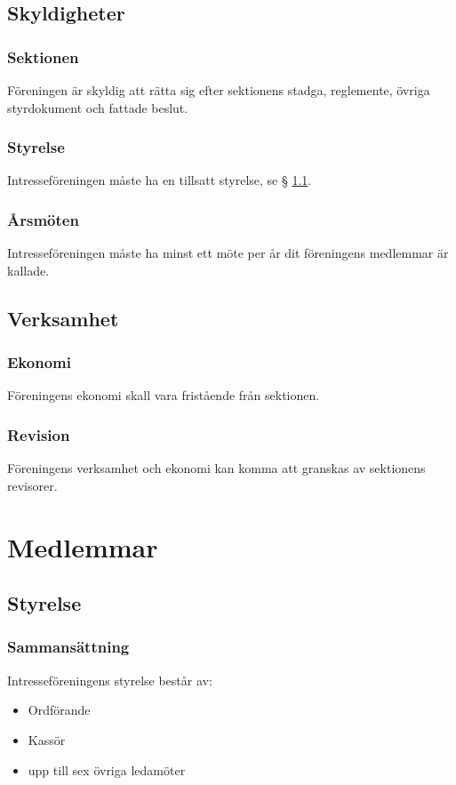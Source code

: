 \documentclass[11pt, noincludeaddress]{classes/cthit}
\begin{document}
\subsection{Skyldigheter}

\subsubsection{Sektionen}
Föreningen är skyldig att rätta sig efter sektionens stadga, reglemente, övriga styrdokument och fattade beslut. 

\subsubsection{Styrelse}
Intresseföreningen måste ha en tillsatt styrelse, se § \ref{styrelse}. 

\subsubsection{Årsmöten}
Intresseföreningen måste ha minst ett möte per år dit föreningens medlemmar är kallade. 

\subsection{Verksamhet}
\subsubsection{Ekonomi}
Föreningens ekonomi skall vara fristående från sektionen.

\subsubsection{Revision}
Föreningens verksamhet och ekonomi kan komma att granskas av sektionens revisorer.

\newpage

\section{Medlemmar}

\subsection{Styrelse}
\label{styrelse}

\subsubsection{Sammansättning}
Intresseföreningens styrelse består av: 
\begin{itemize}
        \item Ordförande
		\item Kassör
		\item upp till sex övriga ledamöter
\end{itemize}
\end{document}
